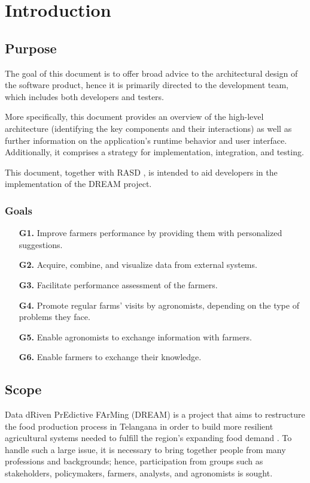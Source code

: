 \chapter{Introduction}

\section{Purpose}

The goal of this document is to offer broad advice to the architectural design of the software product, hence it is primarily directed to the development team, which includes both developers and testers.

More specifically, this document provides an overview of the high-level architecture (identifying the key components and their interactions) as well as further information on the application's runtime behavior and user interface. Additionally, it comprises a strategy for implementation, integration, and testing.

This document, together with RASD \cite{rasd}, is intended to aid developers in the implementation of the DREAM project.

\subsection{Goals} \label{subsec:goals}
\begin{itemize}
	\item [\textbf{G1.}] Improve farmers performance by providing them with personalized suggestions.
	\item [\textbf{G2.}] Acquire, combine, and visualize data from external systems. 
	\item [\textbf{G3.}] Facilitate performance assessment of the farmers.
	\item [\textbf{G4.}] Promote regular farms' visits by agronomists, depending on the type of problems they face.
	\item [\textbf{G5.}] Enable agronomists to exchange information with farmers.
	\item [\textbf{G6.}] Enable farmers to exchange their knowledge.
\end{itemize}

\section{Scope}

Data dRiven PrEdictive FArMing (DREAM) is a project that aims to restructure the food production process in Telangana in order to build more resilient agricultural systems needed to fulfill the region's expanding food demand \cite{reference_doc}. To handle such a large issue, it is necessary to bring together people from many professions and backgrounds; hence, participation from groups such as stakeholders, policymakers, farmers, analysts, and agronomists is sought.

